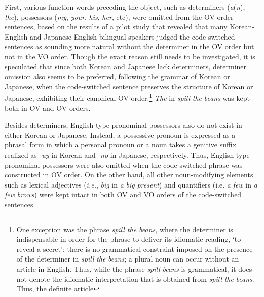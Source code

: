 First, various function words preceding the object, such as determiners (\textit{a}(\textit{n}), \textit{the}), possessors (\textit{my}, \textit{your}, \textit{his}, \textit{her}, etc), were omitted from the \ac{OV} order sentences, based on the results of a pilot study that revealed that many Korean-English and Japanese-English bilingual speakers judged the code-switched sentences as sounding more natural without the determiner in the \ac{OV} order but not in the \ac{VO} order. Though the exact reason still needs to be investigated, it is speculated that since both Korean and Japanese lack determiners, determiner omission also seems to be preferred, following the grammar of Korean or Japanese, when the code-switched sentence preserves the structure of Korean or Japanese, exhibiting their canonical \ac{OV} order.\footnote{One exception was the phrase \textit{spill the beans}, \textrm{where the determiner is indispensable in order for the phrase to deliver its idiomatic reading, ‘to reveal a secret’: there is no grammatical constraint imposed on the presence of the determiner in} \textrm{\textit{spill} \textit{the} \textit{beans}}\textrm{; a plural noun can occur without an article in English. Thus, while the phrase} \textrm{\textit{spill} \textit{beans}} \textrm{is grammatical, it does not denote the idiomatic interpretation that is obtained from} \textrm{\textit{spill} \textit{the} \textit{beans}}. Thus, the definite article} \textrm{\textit{The}} \textrm{in} \textrm{\textit{spill}} \textrm{\textit{the} \textit{beans}} \textrm{was kept both in \ac{OV} and \ac{OV} orders.}
\clearpage

Besides determiners, English-type pronominal possessors also do not exist in either Korean or Japanese. Instead, a possessive pronoun is expressed as a phrasal form in which a personal pronoun or a noun takes a genitive suffix realized as -\textit{uy} in Korean and -\textit{no} in Japanese, respectively. Thus, English-type pronominal possessors were also omitted when the code-switched phrase was constructed in \ac{OV} order. On the other hand, all other noun-modifying elements such as lexical adjectives (\textit{i.e.}, \textit{big} in \textit{a} \textit{big} \textit{present}) and quantifiers (i.e. \textit{a} \textit{few} in \textit{a} \textit{few} \textit{brows}) were kept intact in both \ac{OV} and \ac{VO} orders of the code-switched sentences.

